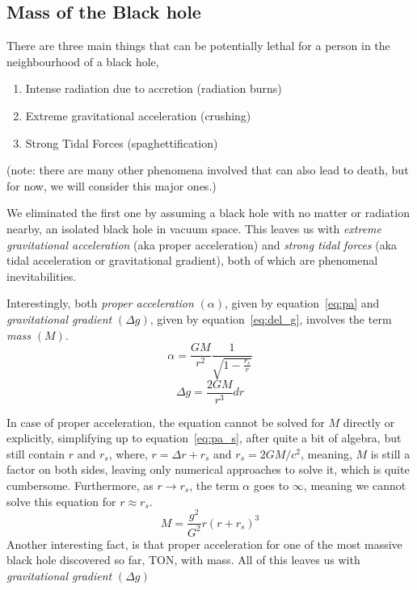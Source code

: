 \subsection{Mass of the Black hole}\label{subsec:M_bh}

There are three main things that can be potentially lethal for a person in the neighbourhood of a black hole, 
\begin{enumerate}
    \item Intense radiation due to accretion (radiation burns)
    \item Extreme gravitational acceleration (crushing)
    \item Strong Tidal Forces (spaghettification)
\end{enumerate}

(note: there are many other phenomena involved that can also lead to death, but for now, we will consider this major ones.)

We eliminated the first one by assuming a black hole with no matter or radiation nearby, an isolated black hole in vacuum space. This leaves us with
\emph{extreme gravitational acceleration} (aka proper acceleration) and \emph{strong tidal forces} (aka tidal acceleration or gravitational gradient), 
both of which are phenomenal inevitabilities. 

Interestingly, both \emph{proper acceleration} \((\alpha)\), given by equation~\ref{eq:pa} and \emph{gravitational gradient} \((\Delta g)\), given by 
equation~\ref{eq:del_g}, involves the term \emph{mass} \((M)\). 
\begin{equation}\label{eq:pa}
    \alpha = \frac{GM}{r^2} \frac{1}{\sqrt{1 - \frac{r_s}{r}}} \tag{3.1}
\end{equation}
\begin{equation}\label{eq:del_g}
    \Delta g = \frac{2GM}{r^3} dr \tag{3.2}
\end{equation}

In case of proper acceleration, the equation cannot be solved for \(M\) directly or explicitly, simplifying up to equation~\ref{eq:pa_s}, 
after quite a bit of algebra, but still contain \(r\) and \(r_s\), where, \(r = \Delta r + r_s\) and \(r_s = 2GM/c^2\), meaning, \(M\) is still a factor on both
sides, leaving only numerical approaches to solve it, which is quite cumbersome. Furthermore, as \(r \rightarrow r_s\), the term \(\alpha\) goes to \(\infty\), 
meaning we cannot solve this equation for \(r \approx r_s\). 
\begin{equation}\label{eq:pa_s}
    M = \frac{g^2}{G^2} r(r+r_s)^3 \tag{3.3}
\end{equation}
Another interesting fact, is that proper acceleration for one of the most massive black hole discovered so far, TON, with mass. All of this leaves us with 
\emph{gravitational gradient} \((\Delta g)\) 

